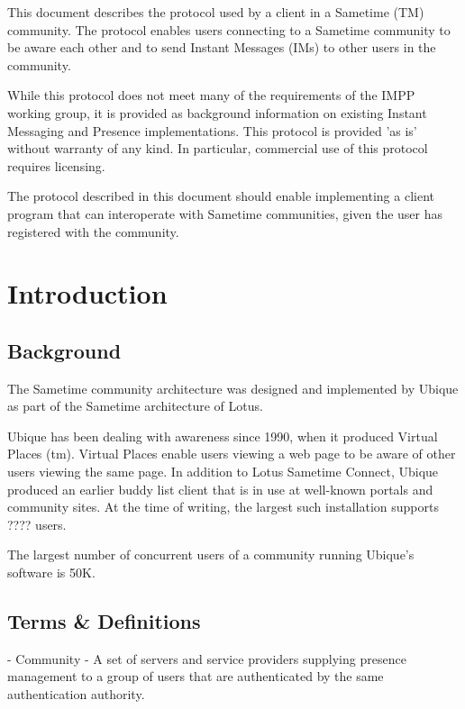 \documentclass[titlepage,oneside]{book}
\begin{document}
\par{} This document describes the protocol used by a client in a
Sametime (TM) community. The protocol enables users connecting to a
Sametime community to be aware each other and to send Instant Messages
(IMs) to other users in the community.

\par{} While this protocol does not meet many of the requirements of
the IMPP working group, it is provided as background information on
existing Instant Messaging and Presence implementations. This protocol
is provided 'as is' without warranty of any kind. In particular,
commercial use of this protocol requires licensing.

\par{} The protocol described in this document should enable
implementing a client program that can interoperate with Sametime
communities, given the user has registered with the community.

\chapter{Introduction}

\section{Background}

\par{} The Sametime community architecture was designed and
implemented by Ubique as part of the Sametime architecture of Lotus.

\par{} Ubique has been dealing with awareness since 1990, when it
produced Virtual Places (tm). Virtual Places enable users viewing a
web page to be aware of other users viewing the same page. In addition
to Lotus Sametime Connect, Ubique produced an earlier buddy list
client that is in use at well-known portals and community sites. At
the time of writing, the largest such installation supports ????
users.

\par{} The largest number of concurrent users of a community running
Ubique's software is 50K.

\section{Terms \& Definitions}

\par{} - Community - A set of servers and service providers supplying
presence management to a group of users that are authenticated by the
same authentication authority.
\end{document}
